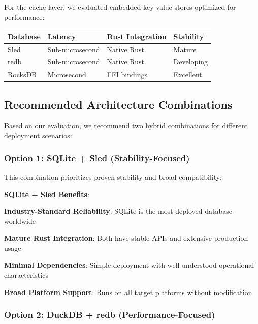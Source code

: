 For the cache layer, we evaluated embedded key-value stores optimized for performance:

\begin{center}
\begin{tabular}{@{}llll@{}}
\toprule
\textbf{Database} & \textbf{Latency} & \textbf{Rust Integration} & \textbf{Stability} \\
\midrule
Sled & Sub-microsecond & Native Rust & Mature \\
redb & Sub-microsecond & Native Rust & Developing \\
RocksDB & Microsecond & FFI bindings & Excellent \\
\bottomrule
\end{tabular}
\end{center}

\subsection*{Recommended Architecture Combinations}

Based on our evaluation, we recommend two hybrid combinations for different deployment scenarios:

\subsubsection*{Option 1: SQLite + Sled (Stability-Focused)}

This combination prioritizes proven stability and broad compatibility:

\begin{alertbox}
\textbf{SQLite + Sled Benefits}:
\begin{compactlist}
    \item \textbf{Industry-Standard Reliability}: SQLite is the most deployed database worldwide
    \item \textbf{Mature Rust Integration}: Both have stable APIs and extensive production usage
    \item \textbf{Minimal Dependencies}: Simple deployment with well-understood operational characteristics
    \item \textbf{Broad Platform Support}: Runs on all target platforms without modification
\end{compactlist}
\end{alertbox}

\subsubsection*{Option 2: DuckDB + redb (Performance-Focused)}

